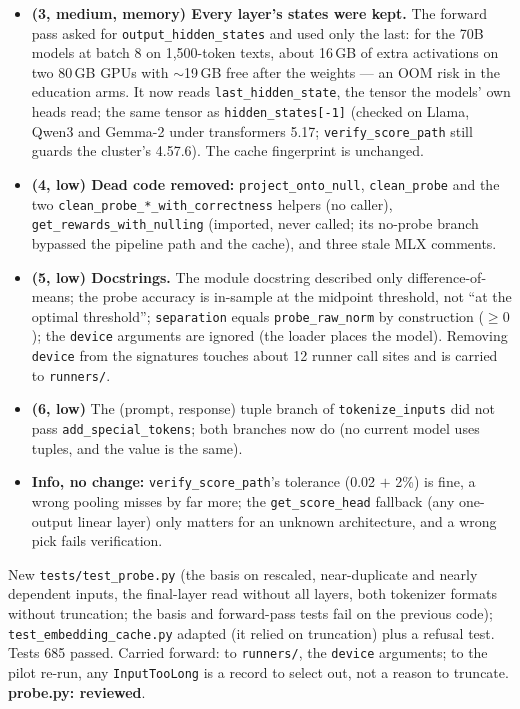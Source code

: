 \documentclass{article}
\begin{document}
\begin{itemize}
        stacks distinct axis directions), but joint nulling is where related directions get stacked. Now two
        passes and a relative tolerance ($10^{-5}$ of the vector's norm; a genuine near-duplicate at cosine
        0.99999 keeps a residual of $4.5\times10^{-3}$). A single direction is normalised bit-identically as
        before; the cross-marker golden file is unchanged.
  \item \textbf{(3, medium, memory) Every layer's states were kept.} The forward pass asked for
        \texttt{output\_hidden\_states} and used only the last: for the 70B models at batch 8 on 1{,}500-token texts,
        about 16\,GB of extra activations on two 80\,GB GPUs with $\sim$19\,GB free after the weights --- an OOM risk
        in the education arms. It now reads \texttt{last\_hidden\_state}, the tensor the models' own heads read; the
        same tensor as \texttt{hidden\_states[-1]} (checked on Llama, Qwen3 and Gemma-2 under transformers 5.17;
        \texttt{verify\_score\_path} still guards the cluster's 4.57.6). The cache fingerprint is unchanged.
  \item \textbf{(4, low) Dead code removed:} \texttt{project\_onto\_null}, \texttt{clean\_probe} and the two
        \texttt{clean\_probe\_*\_with\_correctness} helpers (no caller), \texttt{get\_rewards\_with\_nulling}
        (imported, never called; its no-probe branch bypassed the pipeline path and the cache), and three stale
        MLX comments.
  \item \textbf{(5, low) Docstrings.} The module docstring described only difference-of-means; the probe
        accuracy is in-sample at the midpoint threshold, not ``at the optimal threshold''; \texttt{separation}
        equals \texttt{probe\_raw\_norm} by construction ($\geq0$); the \texttt{device} arguments are ignored (the
        loader places the model). Removing \texttt{device} from the signatures touches about 12 runner call sites
        and is carried to \texttt{runners/}.
  \item \textbf{(6, low)} The (prompt, response) tuple branch of \texttt{tokenize\_inputs} did not pass
        \texttt{add\_special\_tokens}; both branches now do (no current model uses tuples, and the value is the
        same).
  \item \textbf{Info, no change:} \texttt{verify\_score\_path}'s tolerance (0.02 $+$ 2\%) is fine, a wrong pooling
        misses by far more; the \texttt{get\_score\_head} fallback (any one-output linear layer) only matters for
        an unknown architecture, and a wrong pick fails verification.
\end{itemize}
New \texttt{tests/test\_probe.py} (the basis on rescaled, near-duplicate and nearly dependent inputs, the
final-layer read without all layers, both tokenizer formats without truncation; the basis and forward-pass tests
fail on the previous code); \texttt{test\_embedding\_cache.py} adapted (it relied on truncation) plus a refusal
test. Tests 685 passed. Carried forward: to \texttt{runners/}, the \texttt{device} arguments; to the pilot re-run,
any \texttt{InputTooLong} is a record to select out, not a reason to truncate.
\textbf{probe.py: reviewed}.
\end{document}

